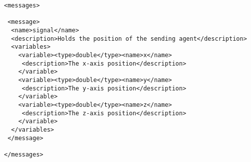 \begin{mylisting}
\begin{verbatim}
<messages>

 <message>
  <name>signal</name>
  <description>Holds the position of the sending agent</description>
  <variables>
    <variable><type>double</type><name>x</name>
     <description>The x-axis position</description>
    </variable>
    <variable><type>double</type><name>y</name>
     <description>The y-axis position</description>
    </variable>
    <variable><type>double</type><name>z</name>
     <description>The z-axis position</description>
    </variable>
  </variables>
 </message>

</messages>
\end{verbatim}
\end{mylisting}
